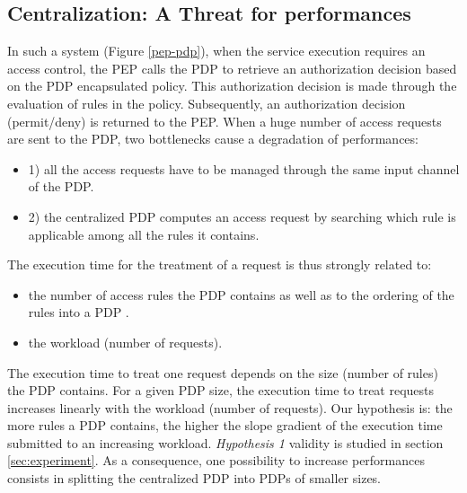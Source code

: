 \subsection{Centralization: A Threat for performances}
In such a system (Figure \ref{pep-pdp}), when the service execution requires an access control, the PEP calls the PDP to 
retrieve an authorization decision based on the PDP encapsulated policy. This authorization decision is made through the evaluation of rules in the policy. 
Subsequently, an authorization decision (permit/deny) is returned to the PEP. When a huge number of access requests are sent to the PDP, two bottlenecks cause a degradation of performances:
\begin{itemize}
 \item 1) all the access requests have to be managed through the same input channel of the PDP. 
 \item 2) the centralized PDP computes an access request by searching which rule is applicable among all the rules it contains.
\end{itemize}

The execution time for the treatment of a request is thus strongly related to:
\begin{itemize} 
\item the number of access rules the PDP contains as well as to the ordering of the rules into a PDP \cite{clustering}.
\item the workload (number of requests).
\end{itemize}
The execution time to treat one request depends on the size (number of rules) the PDP contains. For a given PDP size, the execution time  to treat requests increases linearly with the workload (number of requests). 
Our hypothesis is: the more rules a PDP contains, the higher the slope gradient of the execution time submitted to an increasing workload. 
 \textit{Hypothesis 1} validity is studied in section \ref{sec:experiment}.
As a consequence, one possibility to increase performances consists in splitting the centralized PDP into PDPs of smaller sizes. 


